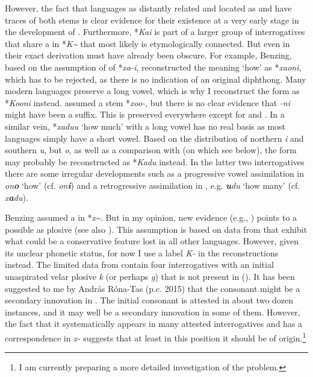 However, the fact that languages as distantly related and located as  and  have traces of both stems is clear evidence for their existence at a very early stage in the development of . Furthermore, *\textit{Kai} is part of a larger group of interrogatives that share a  in *\textit{K{\textasciitilde}} that most likely is etymologically connected. But even in  their exact derivation must have already been obscure. For example, Benzing, based on the assumption of  of *\textit{xa-i}, reconstructed the  meaning ‘how’ as *\textit{xaoni}, which has to be rejected, as there is no indication of an original diphthong. Many modern languages preserve a long vowel, which is why I reconstruct the form as *\textit{Kooni} instead. \cite[70f.]{Janhunen1991} assumed a stem *\textit{xoo-}, but there is no clear evidence that \textit{-ni} might have been a suffix. This  is preserved everywhere except for  and . In a similar vein,   *\textit{xaduu} ‘how much’ with a long vowel has no real basis as most languages simply have a short vowel. Based on the distribution of northern  \textit{i} and southern  \textit{u}, but  \textit{o}, as well as a comparison with  (on which see below), the form may probably be reconstructed as *\textit{Kadu} instead. In the latter two interrogatives there are some irregular developments such as a progressive vowel assimilation in  \textit{on}\textbf{\textit{o}} ‘how’ (cf.  \textit{on}\textbf{\textit{i}}) and a retrogressive assimilation in , e.g.  \textbf{\textit{u}}\textit{du} ‘how many’ (cf.  \textit{x}\textbf{\textit{a}}\textit{du}).

Benzing assumed a   in *\textit{x{\textasciitilde}}. But in my opinion, new evidence (e.g., \citealt{MuYejun1986,Hölzl2017c}) points to a possible  as plosive (see also \citealt{Rozycki1993}). This assumption is based on data from  that exhibit what could be a conservative feature lost in all other  languages. However, given its unclear phonetic status, for now I use a label \textit{K-} in the reconstructions instead. The limited data from  contain four interrogatives with an initial unaspirated velar plosive \textit{k} (or perhaps \textit{g}) that is not present in  (). It has been suggested to me by András Róna-Tas (p.c. 2015) that the consonant might be a secondary innovation in . The initial consonant is attested in about two dozen instances, and it may well be a secondary innovation in some of them. However, the fact that it systematically appears in many attested interrogatives and has a correspondence in  \textit{x-} suggests that at least in this position it should be of  origin.\footnote{I am currently preparing a more detailed investigation of the problem.}

